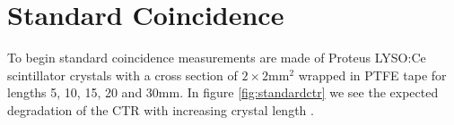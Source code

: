 \section{Standard Coincidence}
To begin standard coincidence measurements are made of Proteus LYSO:Ce scintillator crystals with a cross section of $2\times2$mm$^2$ wrapped in PTFE tape for lengths 5, 10, 15, 20 and 30mm. In figure \ref{fig:standardctr} we see the expected degradation of the CTR with increasing crystal length \cite{r_Paganoni_Pauwels_et_al__2011}\cite{Wiener_Kaul_Surti_Karp_2010}\cite{Choong_2009}\cite{Gola_Piemonte_Tarolli_2013}\cite{o_Pro_Serra_Tarolli_Zorzi_2011}.
